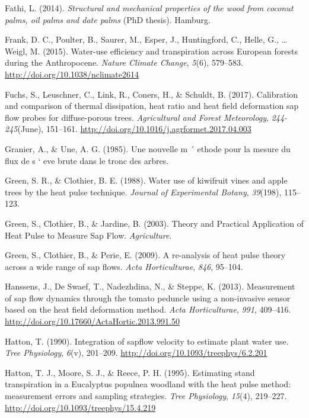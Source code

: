 \documentclass[11pt,twoside]{reedthesis}
\begin{document}
\hypertarget{ref-Fathi2014}{}
Fathi, L. (2014). \emph{Structural and mechanical properties of the wood
from coconut palms, oil palms and date palms} (PhD thesis). Hamburg.

\hypertarget{ref-Frank2015}{}
Frank, D. C., Poulter, B., Saurer, M., Esper, J., Huntingford, C.,
Helle, G., \ldots{} Weigl, M. (2015). Water-use efficiency and
transpiration across European forests during the Anthropocene.
\emph{Nature Climate Change}, \emph{5}(6), 579--583.
\url{http://doi.org/10.1038/nclimate2614}

\hypertarget{ref-Fuchs2017}{}
Fuchs, S., Leuschner, C., Link, R., Coners, H., \& Schuldt, B. (2017).
Calibration and comparison of thermal dissipation, heat ratio and heat
field deformation sap flow probes for diffuse-porous trees.
\emph{Agricultural and Forest Meteorology}, \emph{244-245}(June),
151--161. \url{http://doi.org/10.1016/j.agrformet.2017.04.003}

\hypertarget{ref-Granier1985}{}
Granier, A., \& Une, A. G. (1985). Une nouvelle m ´ ethode pour la
mesure du flux de s ` eve brute dans le tronc des arbres.

\hypertarget{ref-Green1988}{}
Green, S. R., \& Clothier, B. E. (1988). Water use of kiwifruit vines
and apple trees by the heat pulse technique. \emph{Journal of
Experimental Botany}, \emph{39}(198), 115--123.

\hypertarget{ref-Green2003}{}
Green, S., Clothier, B., \& Jardine, B. (2003). Theory and Practical
Application of Heat Pulse to Measure Sap Flow. \emph{Agriculture}.

\hypertarget{ref-Green2009}{}
Green, S., Clothier, B., \& Perie, E. (2009). A re-analysis of heat
pulse theory across a wide range of sap flows. \emph{Acta
Horticulturae}, \emph{846}, 95--104.

\hypertarget{ref-Hanssens2013}{}
Hanssens, J., De Swaef, T., Nadezhdina, N., \& Steppe, K. (2013).
Measurement of sap flow dynamics through the tomato peduncle using a
non-invasive sensor based on the heat field deformation method.
\emph{Acta Horticulturae}, \emph{991}, 409--416.
\url{http://doi.org/10.17660/ActaHortic.2013.991.50}

\hypertarget{ref-Hatton1990}{}
Hatton, T. (1990). Integration of sapflow velocity to estimate plant
water use. \emph{Tree Physiology}, \emph{6}(v), 201--209.
\url{http://doi.org/10.1093/treephys/6.2.201}

\hypertarget{ref-Hatton1995}{}
Hatton, T. J., Moore, S. J., \& Reece, P. H. (1995). Estimating stand
transpiration in a Eucalyptus populnea woodland with the heat pulse
method: measurement errors and sampling strategies. \emph{Tree
Physiology}, \emph{15}(4), 219--227.
\url{http://doi.org/10.1093/treephys/15.4.219}
\end{document}
